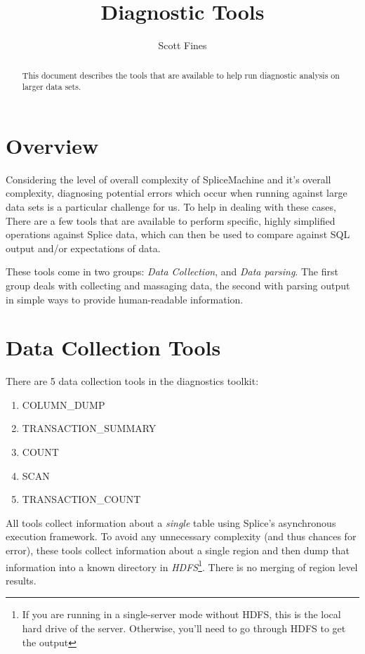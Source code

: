 \documentclass[10pt]{article}
\begin{document}
\title{Diagnostic Tools}
\author{Scott Fines}


\maketitle

\begin{abstract}
This document describes the tools that are available to help run diagnostic analysis on larger data sets.
\end{abstract}

\section{Overview}
Considering the level of overall complexity of SpliceMachine and it's overall complexity, diagnosing potential errors which occur when running against large
data sets is a particular challenge for us. To help in dealing with these cases, There are a few tools that are available to perform specific, highly simplified
operations against Splice data, which can then be used to compare against SQL output and/or expectations of data. 

These tools come in two groups: \emph{Data Collection}, and \emph{Data parsing}. The first group deals with collecting and massaging data, the second with parsing
output in simple ways to provide human-readable information.

\section{Data Collection Tools}
There are 5 data collection tools in the diagnostics toolkit:

\begin{enumerate}
\item COLUMN\_DUMP
\item TRANSACTION\_SUMMARY
\item COUNT
\item SCAN
\item TRANSACTION\_COUNT
\end{enumerate}

All tools collect information about a \emph{single} table using Splice's asynchronous execution framework. To avoid any unnecessary complexity (and thus chances for 
error), these tools collect information about a single region and then dump that information into a known directory in \emph{HDFS}\footnote{If you are running in a single-server mode without HDFS, this is the local hard drive of the server. Otherwise, you'll need to go through HDFS to get the output}. There is no merging of region
level results.
\end{document}
